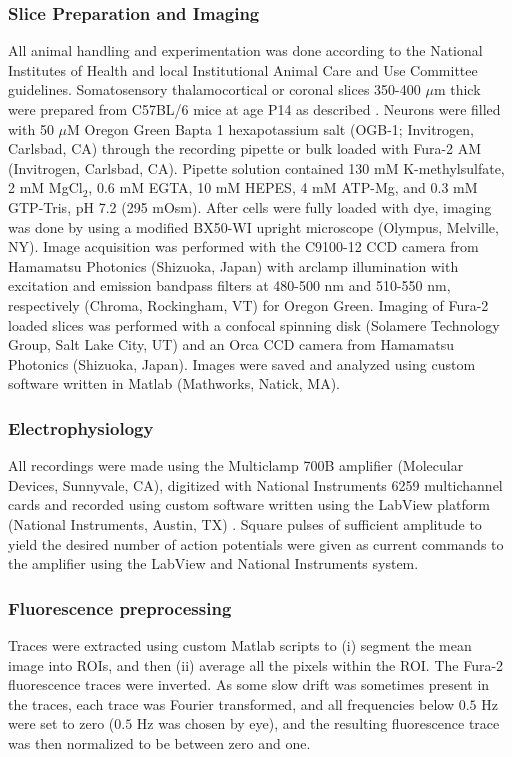 \documentclass{article}
\begin{document}
\subsubsection{Slice Preparation and Imaging} 

All animal handling and experimentation was done according to the National Institutes of Health and local Institutional Animal Care and Use Committee guidelines. Somatosensory thalamocortical or coronal slices 350-400 $\mu$m thick were prepared from C57BL/6 mice at age P14 as described \cite{MacLeanYuste05}. Neurons were filled with 50 $\mu$M Oregon Green Bapta 1 hexapotassium salt (OGB-1; Invitrogen, Carlsbad, CA) through the recording pipette or bulk loaded with Fura-2 AM (Invitrogen, Carlsbad, CA). Pipette solution contained 130 mM K-methylsulfate, 2 mM MgCl$_2$, $0.6$ mM EGTA, 10 mM HEPES, 4 mM ATP-Mg, and $0.3$ mM GTP-Tris, pH 7.2 (295 mOsm).  After cells were fully loaded with dye, imaging was done by using a modified BX50-WI upright microscope (Olympus, Melville, NY).  Image acquisition was performed with the C9100-12 CCD camera from Hamamatsu Photonics (Shizuoka, Japan) with arclamp illumination with excitation and emission bandpass filters at 480-500 nm and 510-550 nm, respectively  (Chroma, Rockingham, VT) for Oregon Green. Imaging of Fura-2 loaded slices was performed with a confocal spinning disk (Solamere Technology Group, Salt Lake City, UT) and an Orca CCD camera from Hamamatsu Photonics (Shizuoka, Japan). Images were saved and analyzed using custom software written in Matlab (Mathworks, Natick, MA).

\subsubsection{Electrophysiology}

All recordings were made using the Multiclamp 700B amplifier (Molecular Devices, Sunnyvale, CA), digitized with National Instruments 6259 multichannel cards and recorded using custom software written using the LabView platform (National Instruments, Austin, TX) .  Square pulses of sufficient amplitude to yield the desired number of action potentials were given as current commands to the amplifier using the LabView and National Instruments system.

\subsubsection{Fluorescence preprocessing}

Traces were extracted using custom Matlab scripts to (i) segment the mean image into ROIs, and then (ii) average all the pixels within the ROI.  The Fura-2 fluorescence traces were inverted.  As some slow drift was sometimes present in the traces, each trace was Fourier transformed, and all frequencies below $0.5$ Hz were set to zero ($0.5$ Hz was chosen by eye), and the resulting fluorescence trace was then normalized to be between zero and one.  
\end{document}
